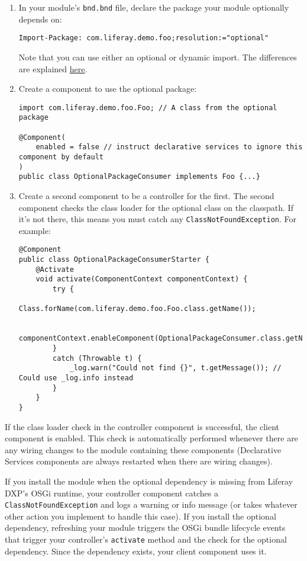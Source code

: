 \begin{enumerate}
\def\labelenumi{\arabic{enumi}.}
\item
  In your module's \texttt{bnd.bnd} file, declare the package your
  module optionally depends on:

\begin{verbatim}
Import-Package: com.liferay.demo.foo;resolution:="optional"
\end{verbatim}

  Note that you can use either an optional or dynamic import. The
  differences are explained
  \href{https://osgi.org/specification/osgi.core/7.0.0/framework.module.html\#i2548181}{here}.
\item
  Create a component to use the optional package:

\begin{verbatim}
import com.liferay.demo.foo.Foo; // A class from the optional package

@Component(
    enabled = false // instruct declarative services to ignore this component by default
)
public class OptionalPackageConsumer implements Foo {...}
\end{verbatim}
\item
  Create a second component to be a controller for the first. The second
  component checks the class loader for the optional class on the
  classpath. If it's not there, this means you must catch any
  \texttt{ClassNotFoundException}. For example:

\begin{verbatim}
@Component
public class OptionalPackageConsumerStarter {
    @Activate
    void activate(ComponentContext componentContext) {
        try {
            Class.forName(com.liferay.demo.foo.Foo.class.getName());

            componentContext.enableComponent(OptionalPackageConsumer.class.getName());
        }
        catch (Throwable t) {
            _log.warn("Could not find {}", t.getMessage()); // Could use _log.info instead
        }
    }
}
\end{verbatim}
\end{enumerate}

If the class loader check in the controller component is successful, the
client component is enabled. This check is automatically performed
whenever there are any wiring changes to the module containing these
components (Declarative Services components are always restarted when
there are wiring changes).

If you install the module when the optional dependency is missing from
Liferay DXP's OSGi runtime, your controller component catches a
\texttt{ClassNotFoundException} and logs a warning or info message (or
takes whatever other action you implement to handle this case). If you
install the optional dependency, refreshing your module triggers the
OSGi bundle lifecycle events that trigger your controller's
\texttt{activate} method and the check for the optional dependency.
Since the dependency exists, your client component uses it.

